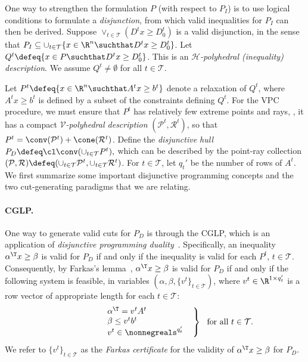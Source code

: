 \documentclass[oribibl,envcountsame]{llncs}
\theoremstyle{remark}
\theoremstyle{definition}
\newcommand{\rlaptext}[1]{\rlap{\text{#1}}}
\newcommand{\pointset}{\mathcal{P}}
\newcommand{\rayset}{\mathcal{R}}
\newcommand{\PI}{P_{I}}
\newcommand{\PD}{P_{D}}
\newcommand{\disjTermsIndexSet}{\mathcal{T}}
\newcommand{\numRowsPt}{q_t'}
\begin{document}
One way to strengthen the formulation $P$ (with respect to $\PI$) is to use logical conditions to formulate a \emph{disjunction}, from which valid inequalities for $\PI$ can then be derived.
Suppose $\vee_{t \in \disjTermsIndexSet} (D^t x \ge D^t_0)$ is a valid disjunction, in the sense that $\PI \subseteq \cup_{t \in \disjTermsIndexSet} \{x \in \R^n \suchthat D^t x \ge D^t_0\}$.
Let 
    $Q^{t} \defeq \{x \in P \suchthat D^t x \ge D^t_0\}$.
This is an \emph{$\mathcal{H}$-polyhedral (inequality) description}.
We assume $Q^t \ne \emptyset$ for all $t \in \disjTermsIndexSet$.

Let $P^t \defeq \{x \in \R^n \suchthat A^t x \ge b^t\}$ denote a relaxation of $Q^t$, 
where $A^t x \ge b^t$ is defined by a subset of the constraints defining $Q^t$.
For the VPC procedure, we must ensure that $P^t$ has relatively few extreme points and rays, , it has a compact \emph{$\mathcal{V}$-polyhedral description} $(\pointset^t, \rayset^t)$, so that $P^t = \conv(\pointset^t) + \cone(\rayset^t)$.
Define the \emph{disjunctive hull} 
    $
        \PD
        \defeq
        \cl\conv(\cup_{t \in \disjTermsIndexSet} P^t)
        ,
    $
    which can be described by the point-ray collection
  $(\pointset, \rayset) \defeq (\cup_{t \in \disjTermsIndexSet} \pointset^t, \cup_{t \in \disjTermsIndexSet} \rayset^t)$.
For $t \in \disjTermsIndexSet$, let $\numRowsPt$ be the number of rows of $A^t$.
We first summarize some important disjunctive programming concepts and the two cut-generating paradigms that we are relating.

\paragraph{CGLP.}
One way to generate valid cuts for $\PD$ is through the CGLP, which is an application of \emph{disjunctive programming duality}~\cite[Section~4]{Balas79}.
Specifically, an inequality $\alpha^\T x \ge \beta$ is valid for $\PD$ if and only if the inequality is valid for each $P^t$, $t \in \disjTermsIndexSet$.
Consequently, by Farkas's lemma~\cite{Farkas02}, 
$\alpha^\T x \ge \beta$ is valid for $\PD$ if and only if the following system is feasible, in variables $(\alpha,\beta,\{v^t\}_{t \in \disjTermsIndexSet})$, where $v^t \in \R^{1 \times \numRowsPt}$ is a row vector of appropriate length for each $t \in \disjTermsIndexSet$:
\begin{align}
  \label{gen-CGLP}
  \left.
  \begin{array}{l}
    \alpha^\T = v^t A^t \\
    \beta \le v^t b^t \\
    v^t \in \nonnegreals^{\numRowsPt}
  \end{array}
  \ \ \right\}
  \ \ 
  \rlaptext{for all $t \in \disjTermsIndexSet$.}
\end{align}
We refer to $\{v^t\}_{t \in \disjTermsIndexSet}$ as the \emph{Farkas certificate} for the validity of $\alpha^\T x \ge \beta$ for $\PD$.
\end{document}

